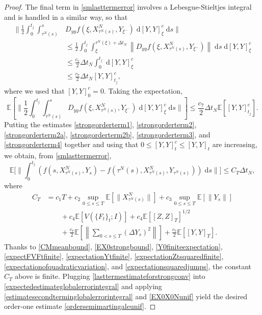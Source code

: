 \documentclass[reqno,12pt]{amsart}
\theoremstyle{plain} %
\theoremstyle{definition} %
\begin{document}
\begin{proof}
    The final term in \eqref{smlasttermerror} involves a Lebesgue-Stieltjes integral and is handled in a similar way, so that
    \begin{align*}
        \bigg\|\frac{1}{2} \int_0^{t_j} \int_{\tau^N(s)}^s & D_{yy}f(\xi, X_{\tau^N(s)}^N, Y_{\xi^-})\;\mathrm{d}[Y, Y]_\xi^c\;\mathrm{d}s \bigg\| \\
        & \leq \frac{1}{2} \int_0^{t_j} \int_{\xi}^{\tau^N(\xi) + \Delta t_N} \left\|D_{yy}f(\xi, X_{\tau^N(s)}^N, Y_{\xi^-})\right\|\;\mathrm{d}s\;\mathrm{d}[Y, Y]_\xi^c \\
        & \leq \frac{c_7}{2}\Delta t_N\int_0^{t_j} \;\mathrm{d}[Y, Y]_\xi^c \\ 
        & \leq \frac{c_7}{2}\Delta t_N [Y, Y]_{t_j}^c,
    \end{align*}
    where we used that $[Y, Y]_0^c = 0.$ Taking the expectation,
    \begin{equation}
        \label{strongorderterm4}
        \mathbb{E}\left[\bigg\|\frac{1}{2} \int_0^{t_j} \int_{\tau^N(s)}^s D_{yy}f(\xi, X_{\tau^N(s)}^N, Y_{\xi^-})\;\mathrm{d}[Y, Y]_\xi^c\;\mathrm{d}s \bigg\|\right] \leq \frac{c_7}{2}\Delta t_N \mathbb{E}\left[[Y, Y]_{t_j}^c\right].
    \end{equation}
    Putting the estimates \eqref{strongorderterm1}, \eqref{strongorderterm2}, \eqref{strongorderterm2a}, \eqref{strongorderterm2b}, \eqref{strongorderterm3}, and \eqref{strongorderterm4} together and using that $0 \leq [Y, Y]_t^c \leq [Y, Y]_t$ are increasing, we obtain, from \eqref{smlasttermerror},
    \begin{equation}
        \label{lasttermestimateforstrongconv}
        \mathbb{E}\bigg[\bigg\| \int_0^{t_j} \left( f(s, X_{\tau^N(s)}^N, Y_s) - f(\tau^N(s), X_{\tau^N(s)}^N, Y_{\tau^N(s)}) \right)\;\mathrm{d}s \bigg\|\bigg] \leq C_T \Delta t_N,
    \end{equation}
    where
    \begin{equation*}
        \begin{aligned}
            C_T & = c_1 T + c_2\sup_{0\leq s \leq T} \mathbb{E}\left[\|X_{\tau^N(s)}^N\|\right] + c_3\sup_{0 \leq s \leq T}\mathbb{E}\left[\|Y_s\|\right] \\
            & \qquad + c_4\mathbb{E}\left[ V(\{F_t\}_t; I) \right] + c_4\mathbb{E}\left[ [Z, Z]_T\right]^{1/2} \\
            & \qquad + \frac{c_7}{2} \mathbb{E}\left[\left\|\sum_{0 < s \leq T}\left( \Delta Y_s \right)^2\right\|\right] + \frac{c_7}{2} \mathbb{E}\left[[Y, Y]_T\right].
        \end{aligned}
    \end{equation*}
    Thanks to \eqref{CMmeanbound}, \eqref{EX0strongbound}, \eqref{Y0finiteexpectation}, \eqref{expectFVFtfinite}, \eqref{expectationYtfinite}, \eqref{expectationZtsquaredfinite}, \eqref{expectationofquadraticvariation}, and \eqref{expectationsquaredjumps}, the constant $C_T$ above is finite. Plugging \eqref{lasttermestimateforstrongconv} into \eqref{expectedestimateglobalerrorintegral} and applying \eqref{estimatesecondterminglobalerrorintegral} and \eqref{EX0X0Nunif} yield the desired order-one estimate \eqref{ordersemimartingaleunif}.
\end{proof}
\end{document}
